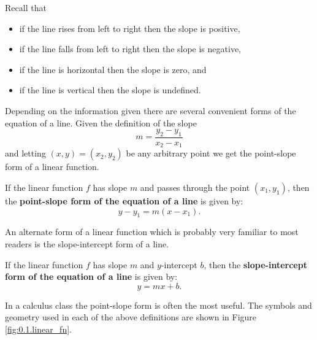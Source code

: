 \begin{minipage}{0.4\columnwidth}
    Recall that
\begin{itemize}
    \item if the line rises from left to right then the slope is positive,
    \item if the line falls from left to right then the slope is negative,
    \item if the line is horizontal then the slope is zero, and
    \item if the line is vertical then the slope is undefined.
\end{itemize}
\end{minipage}
\begin{minipage}{0.5\columnwidth}
    \begin{center}
    \end{center}
\end{minipage}\bigskip

Depending on the information given there are several convenient forms of the equation of a
line.  Given the definition of the slope
\[ m = \frac{y_2 - y_1}{x_2 - x_1} \]
and letting $(x,y) = (x_2,y_2)$ be any arbitrary point we get the point-slope form of a
linear function.
\begin{definition}
If the linear function $f$ has slope $m$ and passes through the
point $(x_1,y_1)$, then the {\bf point-slope form of the equation of a line} is given by: 
\[ y-y_1=m(x- x_1).  \]
\end{definition}

An alternate form of a linear function which is probably very familiar to most readers is
the slope-intercept form of a line.
\begin{definition}
If the linear function $f$ has slope $m$ and $y$-intercept $b$, then the
{\bf slope-intercept form of the equation of a line} is given by: 
\[ y=mx + b.  \]
\end{definition}
In a calculus class the point-slope form is often the most useful. The
symbols and geometry used in each of the above definitions are shown in Figure
\ref{fig:0.1.linear_fn}.

